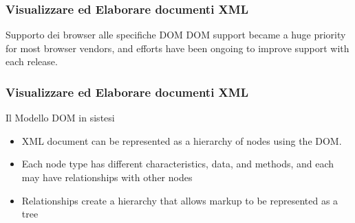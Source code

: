 \begin{frame}
    \frametitle{Visualizzare ed Elaborare documenti XML}
    \addtocounter{nframe}{1}
    

     \begin{block}{Supporto dei browser alle specifiche DOM}
        DOM support became a huge priority for most browser vendors, and efforts have been ongoing to improve support with each release.
     \end{block}
     
\end{frame}


\begin{frame}
    \frametitle{Visualizzare ed Elaborare documenti XML}
    \addtocounter{nframe}{1}
    

     \begin{block}{Il Modello DOM in sistesi}
        \begin{itemize}
            \item XML document can be represented as a hierarchy of nodes using the DOM.
            \item Each node type has different characteristics, data, and methods, and each may have relationships with other nodes
            \item Relationships create a hierarchy that allows markup to be represented as a tree
        \end{itemize}
     \end{block}
     
\end{frame}

